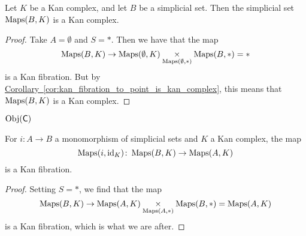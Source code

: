 \documentclass[main.tex]{subfiles}
\begin{document}
\begin{corollary}
  \label{cor:mapping_space_to_kan_complex_is_kan_complex}
  Let $K$ be a Kan complex, and let $B$ be a simplicial set. Then the simplicial set $\operatorname{Maps}(B, K)$ is a Kan complex.
\end{corollary}
\begin{proof}
  Take $A = \emptyset$ and $S = *$. Then we have that the map
  \begin{equation*}
    \operatorname{Maps}(B, K) \to \operatorname{Maps}(\emptyset, K) \underset{\operatorname{Maps}(\emptyset,*)}{\times} \operatorname{Maps}(B, *) = *
  \end{equation*}
  is a Kan fibration. But by \hyperref[cor:kan_fibration_to_point_is_kan_complex]{Corollary~\ref*{cor:kan_fibration_to_point_is_kan_complex}}, this means that $\operatorname{Maps}(B, K)$ is a Kan complex.
\end{proof}

$\operatorname{Obj}(\mathsf{C})$

\begin{corollary}
  \label{cor:maps_functor_preserves_kan_fibrations_in_first_slot}
  For $i\colon A \to B$ a monomorphism of simplicial sets and $K$ a Kan complex, the map
  \begin{equation*}
    \operatorname{Maps}(i, \mathrm{id}_{K})\colon \operatorname{Maps}(B, K) \to \operatorname{Maps}(A, K)
  \end{equation*}
  is a Kan fibration.
\end{corollary}
\begin{proof}
  Setting $S = *$, we find that the map
  \begin{equation*}
    \operatorname{Maps}(B, K) \to \operatorname{Maps}(A, K) \underset{\operatorname{Maps}(A, *)} \times \operatorname{Maps}(B, *) = \operatorname{Maps}(A, K)
  \end{equation*}
  is a Kan fibration, which is what we are after.
\end{proof}
\end{document}
